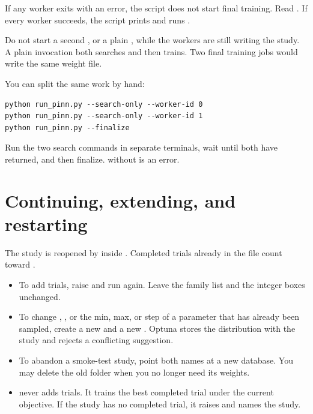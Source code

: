 If any worker exits with an error, the script does not start final training.
Read .
If every worker succeeds, the script prints  and runs .

Do not start a second , or a plain , while the workers are still writing the study.
A plain invocation both searches and then trains.
Two final training jobs would write the same weight file.

You can split the same work by hand:

\begin{lstlisting}[style=sh]
python run_pinn.py --search-only --worker-id 0
python run_pinn.py --search-only --worker-id 1
python run_pinn.py --finalize
\end{lstlisting}

Run the two search commands in separate terminals, wait until both have returned, and then finalize.
 without  is an error.

\section{Continuing, extending, and restarting}

The study is reopened by  inside .
Completed trials already in the file count toward .

\begin{itemize}
\item To add trials, raise  and run again.
  Leave the family list and the integer boxes unchanged.
\item To change , , or the min, max, or step of a parameter that has already been sampled, create a new  and a new .
  Optuna stores the distribution with the study and rejects a conflicting suggestion.
\item To abandon a smoke-test study, point both names at a new database.
  You may delete the old  folder when you no longer need its weights.
\item {} never adds trials.
  It trains the best completed trial under the current objective.
  If the study has no completed trial, it raises  and names the study.
\end{itemize}

